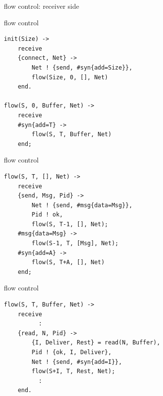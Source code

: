 \begin{frame}{flow control: receiver side}
\end{frame}

\begin{frame}[fragile]{flow control}

  \begin{lstlisting}
init(Size) ->
    receive
	{connect, Net} ->
	    Net ! {send, #syn{add=Size}},
	    flow(Size, 0, [], Net)
    end.
    
flow(S, 0, Buffer, Net) ->
    receive
	#syn{add=T} ->
	    flow(S, T, Buffer, Net)
    end;
  \end{lstlisting}
\end{frame}



\begin{frame}[fragile]{flow control}

  \begin{lstlisting}
flow(S, T, [], Net) ->
    receive 
	{send, Msg, Pid} ->
	    Net ! {send, #msg{data=Msg}},
	    Pid ! ok,
	    flow(S, T-1, [], Net);
	#msg{data=Msg} ->
	    flow(S-1, T, [Msg], Net);
	#syn{add=A} ->
	    flow(S, T+A, [], Net)
    end;
  \end{lstlisting}
\end{frame}


\begin{frame}[fragile]{flow control}

  \begin{lstlisting}
flow(S, T, Buffer, Net) ->
    receive 
          :
	{read, N, Pid} ->
	    {I, Deliver, Rest} = read(N, Buffer),
	    Pid ! {ok, I, Deliver},
	    Net ! {send, #syn{add=I}},
	    flow(S+I, T, Rest, Net);
          :
    end.
  \end{lstlisting}
\end{frame}


